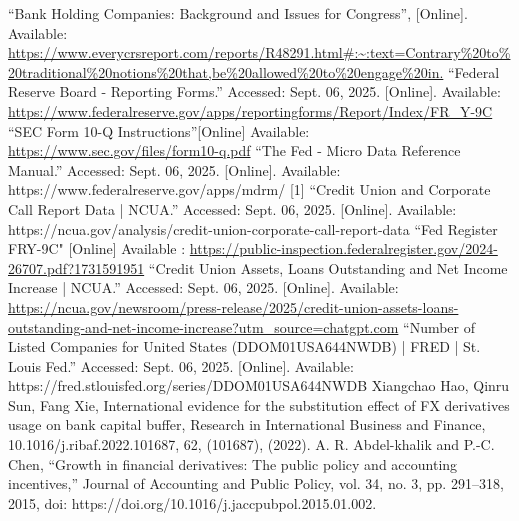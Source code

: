 \documentclass[conference]{IEEEtran}
\begin{document}
\begin{thebibliography}{00}
 “Bank Holding Companies: Background and Issues for Congress”, [Online]. Available: \url{https://www.everycrsreport.com/reports/R48291.html#:~:text=Contrary%20to%20traditional%20notions%20that,be%20allowed%20to%20engage%20in.}
 “Federal Reserve Board - Reporting Forms.” Accessed: Sept. 06, 2025. [Online]. Available: \url{https://www.federalreserve.gov/apps/reportingforms/Report/Index/FR_Y-9C}
 ``SEC Form 10-Q Instructions''[Online] Available: \url{https://www.sec.gov/files/form10-q.pdf} 
 “The Fed - Micro Data Reference Manual.” Accessed: Sept. 06, 2025. [Online]. Available: https://www.federalreserve.gov/apps/mdrm/
 [1] “Credit Union and Corporate Call Report Data | NCUA.” Accessed: Sept. 06, 2025. [Online]. Available: https://ncua.gov/analysis/credit-union-corporate-call-report-data
 ``Fed Register FRY-9C" [Online] Available : \url{https://public-inspection.federalregister.gov/2024-26707.pdf?1731591951}
 “Credit Union Assets, Loans Outstanding and Net Income Increase | NCUA.” Accessed: Sept. 06, 2025. [Online]. Available:\url{ https://ncua.gov/newsroom/press-release/2025/credit-union-assets-loans-outstanding-and-net-income-increase?utm_source=chatgpt.com}
 “Number of Listed Companies for United States (DDOM01USA644NWDB) | FRED | St. Louis Fed.” Accessed: Sept. 06, 2025. [Online]. Available: https://fred.stlouisfed.org/series/DDOM01USA644NWDB
 Xiangchao Hao, Qinru Sun, Fang Xie, International evidence for the substitution effect of FX derivatives usage on bank capital buffer, Research in International Business and Finance, 10.1016/j.ribaf.2022.101687, 62, (101687), (2022).
 A. R. Abdel-khalik and P.-C. Chen, “Growth in financial derivatives: The public policy and accounting incentives,” Journal of Accounting and Public Policy, vol. 34, no. 3, pp. 291–318, 2015, doi: https://doi.org/10.1016/j.jaccpubpol.2015.01.002.


\end{thebibliography}
\end{document}
